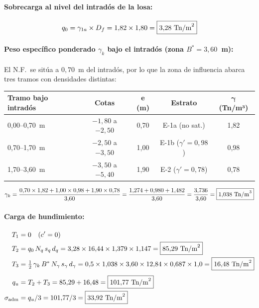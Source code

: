\paragraph{Sobrecarga al nivel del intradós de la losa:}
\[
  q_0 = \gamma_{1a}\times D_f = 1{,}82\times1{,}80 = \boxed{3{,}28~\text{Tn/m}^2}
\]

\paragraph{Peso específico ponderado $\gamma_k$ bajo el intradós (zona $B^*=3{,}60$~m):}

El N.F.\ se sitúa a $0{,}70$~m del intradós, por lo que la zona de influencia
abarca tres tramos con densidades distintas:

\begin{table}[H]
  \centering
  \begin{tabular}{@{}lcccc@{}}
    \toprule
    \textbf{Tramo bajo intradós} & \textbf{Cotas} & \textbf{e (m)} & \textbf{Estrato} & $\boldsymbol{\gamma}$ (Tn/m³)\\
    \midrule
    0,00–0,70~m & $-1{,}80$ a $-2{,}50$ & 0,70 & E-1a (no sat.) & 1,82\\
    0,70–1,70~m & $-2{,}50$ a $-3{,}50$ & 1,00 & E-1b ($\gamma'=0{,}98$) & 0,98\\
    1,70–3,60~m & $-3{,}50$ a $-5{,}40$ & 1,90 & E-2 ($\gamma'=0{,}78$)  & 0,78\\
    \bottomrule
  \end{tabular}
\end{table}

\[
  \gamma_k = \frac{0{,}70\times1{,}82 + 1{,}00\times0{,}98 + 1{,}90\times0{,}78}{3{,}60}
           = \frac{1{,}274+0{,}980+1{,}482}{3{,}60}
           = \frac{3{,}736}{3{,}60} = \boxed{1{,}038~\text{Tn/m}^3}
\]

\paragraph{Carga de hundimiento:}
\begin{align*}
  T_1 &= 0 \quad (c'=0)\\
  T_2 &= q_0\,N_q\,s_q\,d_q
       = 3{,}28\times16{,}44\times1{,}379\times1{,}147
       = \boxed{85{,}29~\text{Tn/m}^2}\\
  T_3 &= \tfrac{1}{2}\,\gamma_k\,B^*\,N_\gamma\,s_\gamma\,d_\gamma
       = 0{,}5\times1{,}038\times3{,}60\times12{,}84\times0{,}687\times1{,}0
       = \boxed{16{,}48~\text{Tn/m}^2}\\[4pt]
  q_u          &= T_2+T_3 = 85{,}29+16{,}48 = \boxed{101{,}77~\text{Tn/m}^2}\\
  \sigma_\text{adm} &= q_u/3 = 101{,}77/3 = \boxed{33{,}92~\text{Tn/m}^2}
\end{align*}

